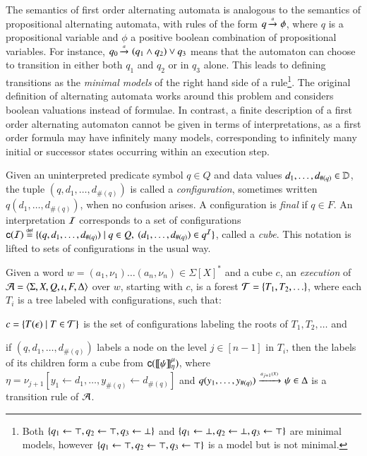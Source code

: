 The semantics of first order alternating automata is analogous to the
semantics of propositional alternating automata, with rules of the
form $q \xrightarrow{{\scriptscriptstyle a}}_{{\scriptstyle }} \phi$, where $q$ is a propositional variable and
$\phi$ a positive boolean combination of propositional variables. For
instance, $q_0 \xrightarrow{{\scriptscriptstyle a}}_{{\scriptstyle }} (q_1 \wedge q_2) \vee q_3$ means that the
automaton can choose to transition in either both $q_1$ and $q_2$ or
in $q_3$ alone. This leads to defining transitions as the
\emph{minimal models} of the right hand side of a rule\footnote{Both
  $\{ q_1 \leftarrow \top, q_2 \leftarrow \top, q_3 \leftarrow
    \bot \}$ and $\{ q_1 \leftarrow \bot, q_2 \leftarrow \bot, q_3
    \leftarrow \top \}$ are minimal models, however $\{ q_1 \leftarrow
    \top, q_2 \leftarrow \top, q_3 \leftarrow \top \}$ is a model but is
  not minimal.}. The original definition of alternating automata
\cite{ChandraKozenStockmeyer81} works around this problem and
considers boolean valuations instead of formulae. In contrast, a
finite description of a first order alternating automaton cannot be
given in terms of interpretations, as a first order formula may have
infinitely many models, corresponding to infinitely many initial or
successor states occurring within an execution step.

Given an uninterpreted predicate symbol $q \in Q$ and data
values $d_1,\ldots,d_{\#(q)} \in \mathbb{D}$, the tuple $(q, d_1,\ldots,d_{\#(q)})$
is called a \emph{configuration}, sometimes written
$q(d_1,\ldots,d_{\#(q)})$, when no confusion arises. A configuration
is \emph{final} if $q \in F$. An interpretation $\mathcal{I}$ corresponds to a
set of configurations $\mathsf{c}({\mathcal{I}}) \stackrel{\scriptscriptstyle{\mathsf{def}}}{=} \{ (q, d_1,\ldots,d_{\#(q)})
  \mid q \in Q,~ (d_1,\ldots,d_{\#(q)}) \in q^{\mathcal{I}} \}$, called a
\emph{cube}. This notation is lifted to sets of configurations in the
usual way.

\begin{definition}\label{def:execution}
Given a word $w=(a_1,\nu_1) \ldots (a_n,\nu_n) \in \Sigma[X]^*$ and a
cube $c$, an \emph{execution} of
$\mathcal{A}=\langle \Sigma,X,Q,\iota,F,\Delta \rangle$ over $w$, starting with $c$, is
a forest $\mathcal{T} = \{ T_1,T_2,\ldots \}$, where each $T_i$ is a tree
labeled with configurations, such that:
\begin{compactenum}
\item\label{it1:execution} $c = \{ T(\epsilon) \mid T \in \mathcal{T} \}$ is the set of
  configurations labeling the roots of $T_1,T_2,\ldots$ and
%
\item\label{it2:execution} if $(q,d_1,\ldots,d_{\#(q)})$ labels a node
  on the level $j \in [n-1]$ in $T_i$, then the labels of its children
  form a cube from $\mathsf{c}({{\bf [\![} \psi {\bf ]\!]}^\mu_{\eta}})$, where $\eta =
  \nu_{j+1}[y_1 \leftarrow d_1,\ldots,y_{\#(q)} \leftarrow d_{\#(q)}]$
  and \(q(y_1,\ldots,y_{\#(q)}) \xrightarrow{{\scriptscriptstyle a_{j+1}(X)}}_{{\scriptstyle }} \psi \in \Delta\)
  is a transition rule of $\mathcal{A}$.
\end{compactenum}
\end{definition}

